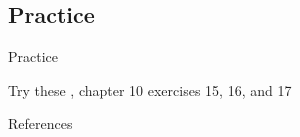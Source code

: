 \documentclass{beamer}
\newcommand{\suboneseven}{Practice}
\begin{document}
    \subsection{\suboneseven}
      \begin{frame}{\suboneseven}
        \begin{block}{Try these}
          \textcite{dawson_language_2016}, chapter 10 exercises 15, 16, and 17
        \end{block}
      \end{frame}

      \begin{frame}{References}
        \printbibliography
      \end{frame}
\end{document}
